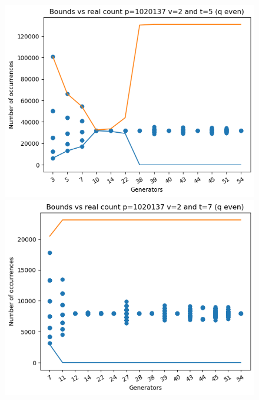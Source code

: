 \documentclass{article}
\begin{document}
\begin{figure}[H]
\begin{minipage}{.49\textwidth}
            \includegraphics[width=\textwidth]{../plots/tuples_figures/1020137v2qeven/test_p1020137_v2_t5_q_even.png}
            \includegraphics[width=\textwidth]{../plots/tuples_figures/1020137v2qeven/test_p1020137_v2_t7_q_even.png}
    \end{minipage}
\end{figure}
\end{document}
